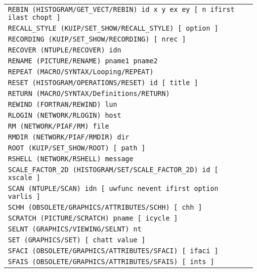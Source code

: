 \begin{longtable}{|>{\footnotesize\tt}lr|}
REBIN (HISTOGRAM/GET_VECT/REBIN)  id x y ex ey [ n ifirst ilast chopt ] & \pageref{ref:HISTOGRAM/GET_VECT/REBIN}\\ 
RECALL_STYLE (KUIP/SET_SHOW/RECALL_STYLE)  [ option ] & \pageref{ref:KUIP/SET_SHOW/RECALL_STYLE}\\ 
RECORDING (KUIP/SET_SHOW/RECORDING)  [ nrec ] & \pageref{ref:KUIP/SET_SHOW/RECORDING}\\ 
RECOVER (NTUPLE/RECOVER)  idn & \pageref{ref:NTUPLE/RECOVER}\\ 
RENAME (PICTURE/RENAME)  pname1 pname2 & \pageref{ref:PICTURE/RENAME}\\ 
REPEAT (MACRO/SYNTAX/Looping/REPEAT)  & \pageref{ref:MACRO/SYNTAX/Looping/REPEAT}\\ 
RESET (HISTOGRAM/OPERATIONS/RESET)  id [ title ] & \pageref{ref:HISTOGRAM/OPERATIONS/RESET}\\ 
RETURN (MACRO/SYNTAX/Definitions/RETURN)  & \pageref{ref:MACRO/SYNTAX/Definitions/RETURN}\\ 
REWIND (FORTRAN/REWIND)  lun & \pageref{ref:FORTRAN/REWIND}\\ 
RLOGIN (NETWORK/RLOGIN)  host & \pageref{ref:NETWORK/RLOGIN}\\ 
RM (NETWORK/PIAF/RM)  file & \pageref{ref:NETWORK/PIAF/RM}\\ 
RMDIR (NETWORK/PIAF/RMDIR)  dir & \pageref{ref:NETWORK/PIAF/RMDIR}\\ 
ROOT (KUIP/SET_SHOW/ROOT)  [ path ] & \pageref{ref:KUIP/SET_SHOW/ROOT}\\ 
RSHELL (NETWORK/RSHELL)  message & \pageref{ref:NETWORK/RSHELL}\\ 
SCALE_FACTOR_2D (HISTOGRAM/SET/SCALE_FACTOR_2D)  id [ xscale ] & \pageref{ref:HISTOGRAM/SET/SCALE_FACTOR_2D}\\ 
SCAN (NTUPLE/SCAN)  idn [ uwfunc nevent ifirst option varlis ] & \pageref{ref:NTUPLE/SCAN}\\ 
SCHH (OBSOLETE/GRAPHICS/ATTRIBUTES/SCHH)  [ chh ] & \pageref{ref:OBSOLETE/GRAPHICS/ATTRIBUTES/SCHH}\\ 
SCRATCH (PICTURE/SCRATCH)  pname [ icycle ] & \pageref{ref:PICTURE/SCRATCH}\\ 
SELNT (GRAPHICS/VIEWING/SELNT)  nt & \pageref{ref:GRAPHICS/VIEWING/SELNT}\\ 
SET (GRAPHICS/SET)  [ chatt value ] & \pageref{ref:GRAPHICS/SET}\\ 
SFACI (OBSOLETE/GRAPHICS/ATTRIBUTES/SFACI)  [ ifaci ] & \pageref{ref:OBSOLETE/GRAPHICS/ATTRIBUTES/SFACI}\\ 
SFAIS (OBSOLETE/GRAPHICS/ATTRIBUTES/SFAIS)  [ ints ] & \pageref{ref:OBSOLETE/GRAPHICS/ATTRIBUTES/SFAIS}\\ 

\end{longtable}

